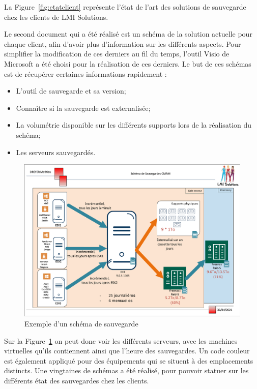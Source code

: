 \documentclass[pfe]{tnreport} %
\begin{document}
La Figure~\ref{fig:etatclient} représente l'état de l'art des solutions de sauvegarde chez les clients de LMI Solutions.

Le second document qui a été réalisé est un schéma de la solution actuelle pour chaque client, afin d'avoir plus d'information sur les différents aspects.
Pour simplifier la modification de ces derniers au fil du temps, l'outil Visio de Microsoft a été choisi pour la réalisation de ces derniers.
Le but de ces schémas est de récupérer certaines informations rapidement : \newline
\begin{itemize}
 \item L'outil de sauvegarde et sa version;
 \item Connaître si la sauvegarde est externalisée;
 \item La volumétrie disponible sur les différents supports lors de la réalisation du schéma;
 \item Les serveurs sauvegardés.\newline
\end{itemize} 


\begin{figure}[h]
  \centering
  \includegraphics[width=18cm]{figures/schemaclient.pdf}
  \caption{Exemple d'un schéma de sauvegarde}
  \label{fig:schemaclient}
\end{figure}

Sur la Figure~\ref{fig:schemaclient} on peut donc voir les différents serveurs, avec les machines virtuelles qu'ils contiennent ainsi que l'heure des sauvegardes. Un code couleur est également appliqué pour des équipements qui se situent à des emplacements distincts. 
Une vingtaines de schémas a été réalisé, pour pouvoir statuer sur les différents état des sauvegardes chez les clients.
\end{document}
